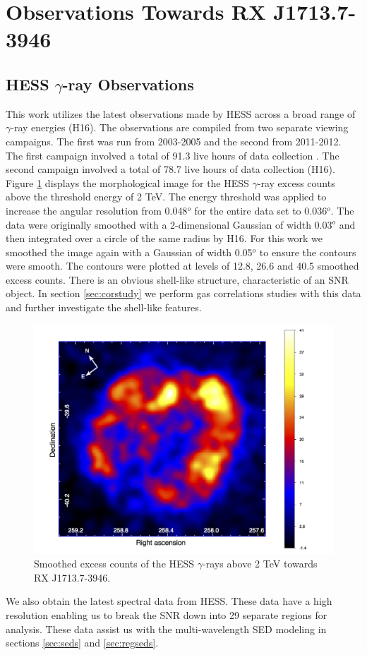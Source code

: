 \documentclass[12pt,a4paper]{article}
\begin{document}
\newpage
\section{Observations Towards RX J1713.7-3946} \label{sec:obvs}
\subsection{HESS $\gamma$-ray Observations}
This work utilizes the latest observations made by HESS across a broad range of $\gamma$-ray energies (H16). The observations are compiled from two separate viewing campaigns. The first was run from 2003-2005 and the second from 2011-2012. The first campaign involved a total of 91.3 live hours of data collection \citep{2007A&A...464..235A}. The second campaign involved a total of 78.7 live hours of data collection (H16). Figure \ref{fig:hessmap} displays the morphological image for the HESS $\gamma$-ray excess counts above the threshold energy of 2 TeV. The energy threshold was applied to increase the angular resolution from 0.048$^o$ for the entire data set to 0.036$^o$. The data were originally smoothed with a 2-dimensional Gaussian of width 0.03$^o$ and then integrated over a circle of the same radius by H16. For this work we smoothed the image again with a Gaussian of width 0.05$^o$ to ensure the contours were smooth. The contours were plotted at levels of 12.8, 26.6 and 40.5 smoothed excess counts. There is an obvious shell-like structure, characteristic of an SNR object. In section \ref{sec:corstudy} we perform gas correlations studies with this data and further investigate the shell-like features.
\begin{figure}[H]
	\centering
	\includegraphics[width=0.74\linewidth, height=0.35\textheight]{hess_map}
	\caption{Smoothed excess counts of the HESS $\gamma$-rays above 2 TeV towards RX J1713.7-3946.}
	\label{fig:hessmap}
\end{figure}
We also obtain the latest spectral data from HESS. These data have a high resolution enabling us to break the SNR down into 29 separate regions for analysis. These data assist us with the multi-wavelength SED modeling in sections \ref{sec:seds} and \ref{sec:regseds}. 
\end{document}
